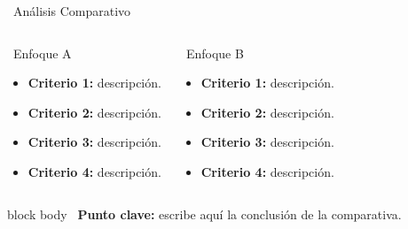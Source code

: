 \documentclass[10pt, aspectratio=169]{beamer}
\begin{document}
\expositor{\Grupo}
\begin{frame}{\faBalanceScale \ Análisis Comparativo}
  \begin{columns}[T, onlytextwidth]
    \begin{block}{\faArrowLeft \ Enfoque A}
      \begin{itemize}
        \item \textbf{Criterio 1:} descripción.
        \item \textbf{Criterio 2:} descripción.
        \item \textbf{Criterio 3:} descripción.
        \item \textbf{Criterio 4:} descripción.
      \end{itemize}
    \end{block}

    \begin{block}{\faArrowRight \ Enfoque B}
      \begin{itemize}
        \item \textbf{Criterio 1:} descripción.
        \item \textbf{Criterio 2:} descripción.
        \item \textbf{Criterio 3:} descripción.
        \item \textbf{Criterio 4:} descripción.
      \end{itemize}
    \end{block}
  \end{columns}

  \vspace{0.35cm}
  \begin{center}
    \begin{beamercolorbox}[rounded=true, wd=0.8\textwidth, sep=0.12cm, center]{block body}
      \footnotesize \textcolor{unabblue}{\faLightbulb \ \textbf{Punto clave:}} escribe aquí la conclusión de la comparativa.
    \end{beamercolorbox}
  \end{center}
\end{frame}
\end{document}
